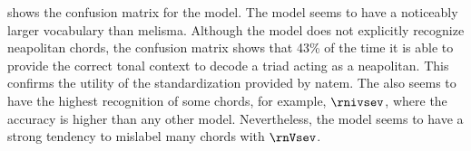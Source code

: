 
 shows the confusion
matrix for the \textcite{chen2021attend} model. The model
seems to have a noticeably larger vocabulary than
\gls{melisma}. Although the model does not explicitly
recognize \gls{neapolitan} chords, the confusion matrix
shows that 43\% of the time it is able to provide the
correct tonal context to decode a triad acting as a
\gls{neapolitan}. This confirms the utility of the
standardization provided by \gls{natem}. The
\textcite{chen2021attend} also seems to have the highest
recognition of some chords, for example, $\rnivsev$, where
the accuracy is higher than any other model. Nevertheless,
the model seems to have a strong tendency to mislabel many
chords with $\rnVsev$.

